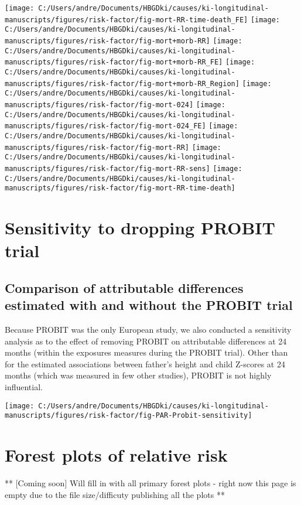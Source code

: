 \documentclass[9pt,]{book}
\begin{document}
\texttt{[image: C:/Users/andre/Documents/HBGDki/causes/ki-longitudinal-manuscripts/figures/risk-factor/fig-mort-RR-time-death\_FE]}
\texttt{[image: C:/Users/andre/Documents/HBGDki/causes/ki-longitudinal-manuscripts/figures/risk-factor/fig-mort+morb-RR]}
\texttt{[image: C:/Users/andre/Documents/HBGDki/causes/ki-longitudinal-manuscripts/figures/risk-factor/fig-mort+morb-RR\_FE]}
\texttt{[image: C:/Users/andre/Documents/HBGDki/causes/ki-longitudinal-manuscripts/figures/risk-factor/fig-mort+morb-RR\_Region]}
\texttt{[image: C:/Users/andre/Documents/HBGDki/causes/ki-longitudinal-manuscripts/figures/risk-factor/fig-mort-024]}
\texttt{[image: C:/Users/andre/Documents/HBGDki/causes/ki-longitudinal-manuscripts/figures/risk-factor/fig-mort-024\_FE]}
\texttt{[image: C:/Users/andre/Documents/HBGDki/causes/ki-longitudinal-manuscripts/figures/risk-factor/fig-mort-RR]}
\texttt{[image: C:/Users/andre/Documents/HBGDki/causes/ki-longitudinal-manuscripts/figures/risk-factor/fig-mort-RR-sens]}
\texttt{[image: C:/Users/andre/Documents/HBGDki/causes/ki-longitudinal-manuscripts/figures/risk-factor/fig-mort-RR-time-death]}

\chapter{Sensitivity to dropping PROBIT trial}\label{no-PROBIT}

\raggedright

\section{Comparison of attributable differences estimated with and
without the PROBIT
trial}\label{comparison-of-attributable-differences-estimated-with-and-without-the-probit-trial}

Because PROBIT was the only European study, we also conducted a
sensitivity analysis as to the effect of removing PROBIT on attributable
differences at 24 months (within the exposures measures during the
PROBIT trial). Other than for the estimated associations between
father's height and child Z-scores at 24 months (which was measured in
few other studies), PROBIT is not highly influential.

\texttt{[image: C:/Users/andre/Documents/HBGDki/causes/ki-longitudinal-manuscripts/figures/risk-factor/fig-PAR-Probit-sensitivity]}

\chapter{Forest plots of relative risk}\label{RR-forest}

\raggedright

** {[}Coming soon{]} Will fill in with all primary forest plots - right
now this page is empty due to the file size/difficuty publishing all the
plots **


\end{document}
